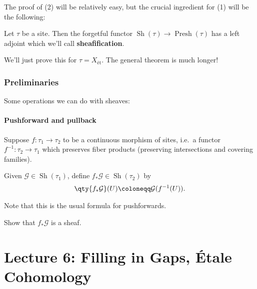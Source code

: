 The proof of (2) will be relatively easy, but the crucial ingredient for
(1) will be the following:

\begin{theorem}[?]

Let \(\tau\) be a site. Then the forgetful functor
\({\operatorname{Sh}}(\tau) \to {\operatorname{Presh}}(\tau)\) has a
left adjoint which we'll call \textbf{sheafification}.

\end{theorem}

We'll just prove this for \(\tau = X_{\text{ét}}\). The general theorem
is much longer!

\hypertarget{preliminaries}{%
\subsubsection{Preliminaries}\label{preliminaries}}

Some operations we can do with sheaves:

\hypertarget{pushforward-and-pullback}{%
\paragraph{Pushforward and pullback}\label{pushforward-and-pullback}}

Suppose \(f:\tau_1 \to \tau_2\) to be a continuous morphism of sites,
i.e.~a functor \(f^{-1} : \tau_2 \to \tau_1\) which preserves fiber
products (preserving intersections and covering families).

\begin{definition}[Pushforwards]

Given \(\mathcal{G}\in {\operatorname{Sh}}(\tau_1)\), define
\(f_* \mathcal{G}\in {\operatorname{Sh}}(\tau_2)\) by
\begin{align*}  
\qty{f_* \mathcal{G}}(U) \coloneqq\mathcal{G}( f^{-1}(U))
.\end{align*}

\end{definition}

Note that this is the usual formula for pushforwards.

\begin{exercise}

Show that \(f_* \mathcal{G}\) is a sheaf.

\end{exercise}

\hypertarget{lecture-6-filling-in-gaps-uxe9tale-cohomology}{%
\section{Lecture 6: Filling in Gaps, Étale
Cohomology}\label{lecture-6-filling-in-gaps-uxe9tale-cohomology}}

